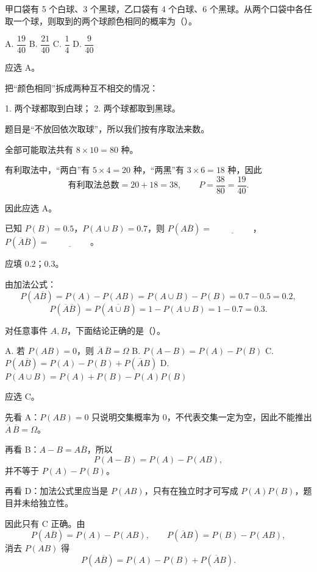 ﻿\documentclass[lang=cn,11pt]{elegantbook}
\begin{document}
\begin{exercise}\label{exer:1-36}
甲口袋有 5 个白球、3 个黑球，乙口袋有 4 个白球、6 个黑球。从两个口袋中各任取一个球，则取到的两个球颜色相同的概率为（\quad）。\par
A. \(\dfrac{19}{40}\)\quad
B. \(\dfrac{21}{40}\)\quad
C. \(\dfrac{1}{4}\)\quad
D. \(\dfrac{9}{40}\)
\end{exercise}

\begin{solution}
应选 A。

把“颜色相同”拆成两种互不相交的情况：

1. 两个球都取到白球；
2. 两个球都取到黑球。

题目是“不放回依次取球”，所以我们按有序取法来数。

全部可能取法共有 \(8\times 10=80\) 种。

有利取法中，“两白”有 \(5\times 4=20\) 种，“两黑”有 \(3\times 6=18\) 种，因此
\[
\text{有利取法总数}=20+18=38,\qquad P=\frac{38}{80}=\frac{19}{40}.
\]

因此应选 A。
\end{solution}

\begin{exercise}\label{exer:1-45}
已知 \(P(B)=0.5\)，\(P(A\cup B)=0.7\)，则 \(P(A\overline{B})=\underline{\hspace{2cm}}\)，\(P(\overline{A}\overline{B})=\underline{\hspace{2cm}}\)。
\end{exercise}

\begin{solution}
应填 \(0.2\)；\(0.3\)。

由加法公式：
\[
P(A\overline{B}) = P(A) - P(AB) = P(A\cup B) - P(B) = 0.7 - 0.5 = 0.2,
\]
\[
P(\overline{A}\overline{B}) = P(\overline{A\cup B}) = 1 - P(A\cup B) = 1 - 0.7 = 0.3.
\]
\end{solution}

\begin{exercise}\label{exer:1-46}
对任意事件 \(A,B\)，下面结论正确的是（\quad）。\par
A. 若 \(P(AB)=0\)，则 \(\overline{A}\,\overline{B}=\Omega\)\quad
B. \(P(A-B)=P(A)-P(B)\)\quad
C. \(P(A\overline{B})=P(A)-P(B)+P(\overline{A}B)\)\quad
D. \(P(A\cup B)=P(A)+P(B)-P(A)P(B)\)
\end{exercise}

\begin{solution}
应选 C。

先看 A：\(P(AB)=0\) 只说明交集概率为 0，不代表交集一定为空，因此不能推出 \(\overline{A}\,\overline{B}=\Omega\)。

再看 B：\(A-B=A\overline{B}\)，所以
\[
P(A-B)=P(A)-P(AB),
\]
并不等于 \(P(A)-P(B)\)。

再看 D：加法公式里应当是 \(P(AB)\)，只有在独立时才可写成 \(P(A)P(B)\)，题目并未给独立性。

因此只有 C 正确。由
\[
P(A\overline{B})=P(A)-P(AB),\qquad P(\overline{A}B)=P(B)-P(AB),
\]
消去 \(P(AB)\) 得
\[
P(A\overline{B}) = P(A) - P(B) + P(\overline{A}B).
\]
\end{solution}
\end{document}
